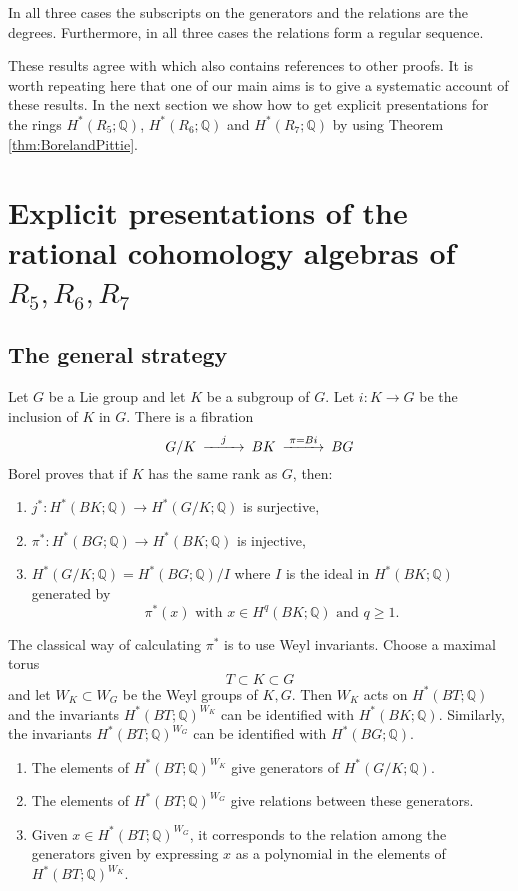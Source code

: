 \documentclass[twoside,a4paper,reqno,11pt]{amsart}
\newcommand{\Q}{\mathbb{Q}}
\begin{document}
In all three cases the subscripts on the generators and the relations are the degrees.   Furthermore, in all three cases the relations  form a regular sequence.  

These results agree with \cite[Table~A]{MR3751970} which also contains references to other proofs.  It is worth repeating here that one of our main aims is to give a systematic account of these results.  In the next section we show how to get explicit presentations for the rings $H^*(R_5; \Q)$, $H^*(R_6; \Q)$ and $H^*(R_7; \Q)$ by using Theorem \ref{thm:BorelandPittie}.  

\section{Explicit presentations of the rational cohomology algebras of $R_5, R_6, R_7$} \label{sec:ratcohR567}

\subsection{The general strategy} \label{subsec:genstratcomps}

Let $G$ be a Lie group and let $K$ be a subgroup of $G$. Let $i : K \to G$ be the inclusion of $K$ in $G$. There is a fibration
$$
\begin{CD}
G/K @>j>> BK   @>{\pi = Bi}>>   BG
\end{CD} 
$$
Borel \cite[Section~26]{MR0051508} proves that if $K$ has the same rank as $G$, then:
\begin{enumerate} 
\item
$j^* : H^*(BK; \Q) \to H^*(G/K; \Q)$ is surjective,  
\item
$\pi^* : H^*(BG; \Q) \to H^*(BK; \Q)$ is injective,
\item
$H^*(G/K; \Q) = H^*(BG; \Q)/I$
where $I$ is the ideal in $H^*(BK; \Q)$ generated by
$$
\pi^*(x) \text{ with } x \in H^q(BK; \Q) \text{ and }  q \geq 1. 
$$
\end{enumerate}
The classical way of calculating $\pi^*$ is to use Weyl invariants. Choose a maximal torus 
\[
T  \subset K \subset G
\] 
and let $W_K \subset W_G$ be the Weyl groups of $K, G$. Then $W_K$ acts on $H^*(BT; \Q)$ and the invariants $H^*(BT; \Q)^{W_K}$ can be identified with $H^*(BK; \Q)$. Similarly, the invariants $H^*(BT; \Q)^{W_G}$ can be identified with $H^*(BG; \Q)$. 
\begin{enumerate}
\item The elements of $H^*(BT; \Q)^{W_K}$ give generators of $H^*(G/K; \Q)$.
\item The elements of $H^*(BT; \Q)^{W_G}$ give relations between these generators. 
\item Given $x \in H^*(BT; \Q)^{W_G}$, it corresponds to the relation among the generators given by expressing $x$ as a polynomial in the elements of $H^*(BT; \Q)^{W_K}$.
\end{enumerate}
\end{document}
